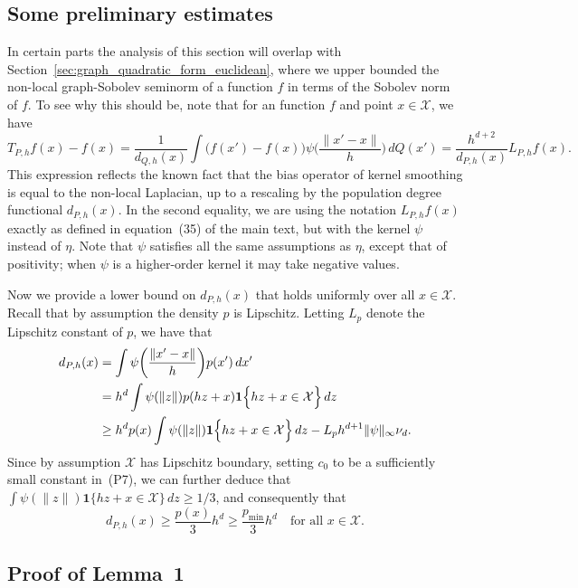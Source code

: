 \documentclass[aos]{imsart}
\theoremstyle{plain}
\theoremstyle{definition}
\theoremstyle{remark}
\newcommand{\mc}[1]{\mathcal{#1}}
\newcommand{\1}{\mathbf{1}}
\begin{document}
\subsection{Some preliminary estimates}
\label{subsec:kernel_smoothing_preliminaries}
In certain parts the analysis of this section will overlap with Section~\ref{sec:graph_quadratic_form_euclidean}, where we upper bounded the non-local graph-Sobolev seminorm of a function $f$ in terms of the Sobolev norm of $f$. To see why this should be, note that for an function $f$ and point $x \in \mc{X}$, we have
\begin{equation*}
T_{P,h}f(x) - f(x) = \frac{1}{d_{Q,h}(x)} \int \bigl(f(x') - f(x)\bigr) \psi\biggl(\frac{\|x' - x\|}{h}\biggr) \,dQ(x') = \frac{h^{d + 2}}{d_{P,h}(x)} L_{P,h}f(x).
\end{equation*}
This expression reflects the known fact that the bias operator of kernel smoothing is equal to the non-local Laplacian, up to a rescaling by the population degree functional $d_{P,h}(x)$.  In the second equality, we are using the notation $L_{P,h}f(x)$ exactly as defined in equation~(35) of the main text, but with the kernel $\psi$ instead of $\eta$. Note that $\psi$ satisfies all the same assumptions as $\eta$, except that of positivity; when $\psi$ is a higher-order kernel it may take negative values. 

Now we provide a lower bound on $d_{P,h}(x)$ that holds uniformly over all $x \in \mc{X}$. Recall that by assumption the density $p$ is Lipschitz. Letting $L_p$ denote the Lipschitz constant of $p$, we have that
\begin{align*}
d_{P,h}(x) & = \int \psi\biggl(\frac{\|x' - x\|}{h}\biggr) p(x') \,dx' \\
& = h^d \int \psi(\|z\|) p(hz + x) \1\Bigl\{ hz + x \in \mc{X} \Bigr\} \,dz \\
& \geq h^d p(x) \int \psi(\|z\|) \1\Bigl\{ hz + x  \in \mc{X}\Bigr\} \,dz - L_p h^{d + 1} \|\psi\|_{\infty} \nu_d.
\end{align*}
Since by assumption $\mc{X}$ has Lipschitz boundary, setting $c_0$ to be a sufficiently small constant in~(P7), we can further deduce that $\int \psi(\|z\|) \1\{hz + x \in \mc{X}\} \,dz \geq 1/3$, and consequently that
\begin{equation}
\label{eqn:degree_lower_bound}
d_{P,h}(x) \geq \frac{p(x)}{3} h^d \geq \frac{p_{\min}}{3}h^d \quad \textrm{for all $x \in \mc{X}$.}
\end{equation}

\subsection{Proof of Lemma~1}
\label{subsec:pf_kernel_smoothing_insample}
\end{document}
